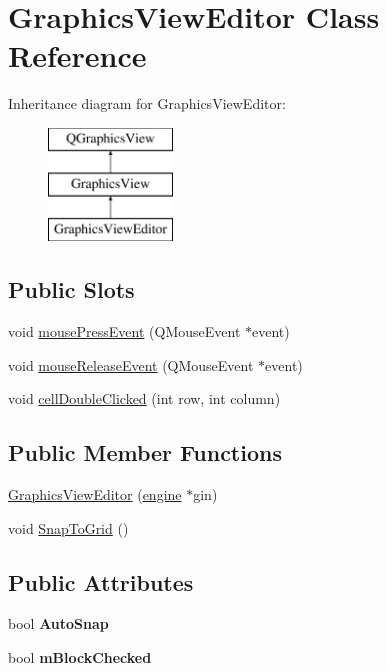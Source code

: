 \hypertarget{class_graphics_view_editor}{\section{Graphics\-View\-Editor Class Reference}
\label{class_graphics_view_editor}
}
Inheritance diagram for Graphics\-View\-Editor\-:\begin{figure}[H]
\begin{center}
\leavevmode
\includegraphics[height=3.000000cm]{class_graphics_view_editor}
\end{center}
\end{figure}
\subsection*{Public Slots}
\begin{DoxyCompactItemize}
\item 
void \hyperlink{class_graphics_view_editor_a6709bc9e3a7f23511cfa0c4db6d92b5a}{mouse\-Press\-Event} (Q\-Mouse\-Event $\ast$event)
\item 
void \hyperlink{class_graphics_view_editor_aeba5b3d56d1e31abe9131476ddd7d20e}{mouse\-Release\-Event} (Q\-Mouse\-Event $\ast$event)
\item 
void \hyperlink{class_graphics_view_editor_a662d6bdadf85a5726a895218d08fdb78}{cell\-Double\-Clicked} (int row, int column)
\end{DoxyCompactItemize}
\subsection*{Public Member Functions}
\begin{DoxyCompactItemize}
\item 
\hyperlink{class_graphics_view_editor_a23421b24ada3080db4b460bf00ac9965}{Graphics\-View\-Editor} (\hyperlink{classengine}{engine} $\ast$gin)
\item 
void \hyperlink{class_graphics_view_editor_a5a50c83ccce7cf211e36507beab4d68a}{Snap\-To\-Grid} ()
\end{DoxyCompactItemize}
\subsection*{Public Attributes}
\begin{DoxyCompactItemize}
\item 
\hypertarget{class_graphics_view_editor_a30d6a7e9b7771e24efbc7e7235b84f08}{bool {\bfseries Auto\-Snap}}\label{class_graphics_view_editor_a30d6a7e9b7771e24efbc7e7235b84f08}

\item 
\hypertarget{class_graphics_view_editor_a9c52faf34ae6a7a894d37de00b1cd73a}{bool {\bfseries m\-Block\-Checked}}\label{class_graphics_view_editor_a9c52faf34ae6a7a894d37de00b1cd73a}

\end{DoxyCompactItemize}
